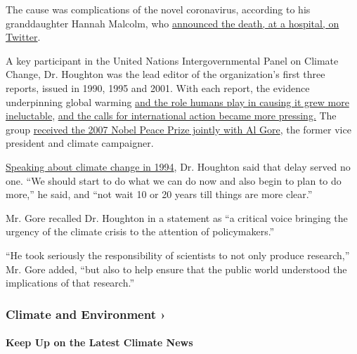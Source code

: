 The cause was complications of the novel coronavirus, according to his
granddaughter Hannah Malcolm, who
\href{https://twitter.com/hannahmmalcolm/status/1250778555505655808}{announced
the death, at a hospital, on Twitter}.

A key participant in the United Nations Intergovernmental Panel on
Climate Change, Dr. Houghton was the lead editor of the organization's
first three reports, issued in 1990, 1995 and 2001. With each report,
the evidence underpinning global warming
\href{https://archive.ipcc.ch/publications_and_data/ar4/wg1/en/ch9s9-1-3.html}{and
the role humans play in causing it grew more ineluctable},
\href{https://www.nytimes3xbfgragh.onion/2000/10/26/us/a-shift-in-stance-on-global-warming-theory.html}{and
the calls for international action became more pressing.} The group
\href{https://www.nobelprize.org/prizes/peace/2007/summary/}{received
the 2007 Nobel Peace Prize jointly with Al Gore}, the former vice
president and climate campaigner.

\href{https://www.nytimes3xbfgragh.onion/1994/09/20/science/emissions-must-be-cut-to-avert-shift-in-climate-panel-says.html}{Speaking
about climate change in 1994}, Dr. Houghton said that delay served no
one. ``We should start to do what we can do now and also begin to plan
to do more,'' he said, and ``not wait 10 or 20 years till things are
more clear.''

Mr. Gore recalled Dr. Houghton in a statement as ``a critical voice
bringing the urgency of the climate crisis to the attention of
policymakers.''

``He took seriously the responsibility of scientists to not only produce
research,'' Mr. Gore added, ``but also to help ensure that the public
world understood the implications of that research.''

\href{https://www.nytimes3xbfgragh.onion/section/climate?action=click\&pgtype=Article\&state=default\&region=MAIN_CONTENT_1\&context=storylines_keepup}{}

\hypertarget{climate-and-environment-}{%
\subsubsection{Climate and Environment
›}\label{climate-and-environment-}}

\hypertarget{keep-up-on-the-latest-climate-news}{%
\paragraph{Keep Up on the Latest Climate
News}\label{keep-up-on-the-latest-climate-news}}

